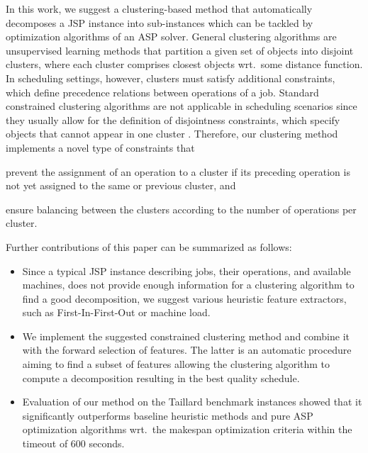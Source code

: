 \documentclass[runningheads]{llncs}
\begin{document}

In this work, we suggest a clustering-based method that automatically decomposes a JSP instance into sub-instances which can be tackled by 
optimization algorithms of an ASP solver. 
General clustering algorithms are unsupervised learning methods that partition a given set of objects into disjoint clusters, where each cluster comprises closest objects wrt.\ some distance function. 
In scheduling settings, however, clusters must satisfy additional constraints, which define precedence relations between operations of a job. Standard constrained clustering algorithms are not applicable in scheduling scenarios since they usually allow for the definition of disjointness constraints, which specify objects that cannot appear in one cluster \cite{zhang2019framework,wagstaff2001constrained,ding2020unified}. 
Therefore, our clustering method implements a novel type of constraints that
\begin{enumerate*}[label=\emph{(\roman*)}]
  \item prevent the assignment of an operation to a cluster if its preceding operation is not yet assigned to the same or previous cluster, and
  \item ensure balancing between the clusters according to the number of operations per cluster.
\end{enumerate*}
Further contributions of this paper can be summarized as follows:
\begin{itemize}
  \item Since a typical JSP instance describing jobs, their operations, and available machines, does not provide enough information for a clustering algorithm to find a good decomposition, we suggest various heuristic feature extractors, such as First-In-First-Out or machine load.
  \item We implement the suggested constrained clustering method and combine it with the forward selection of features. The latter is an automatic procedure aiming to find a subset of features allowing the clustering algorithm to compute a decomposition resulting in the best quality schedule.
  \item Evaluation of our method on the Taillard benchmark instances \cite{taillard1993benchmarks} showed that it significantly outperforms baseline heuristic methods and pure ASP optimization algorithms wrt.\ the makespan optimization criteria within the timeout of 600 seconds.
\end{itemize}
\end{document}
